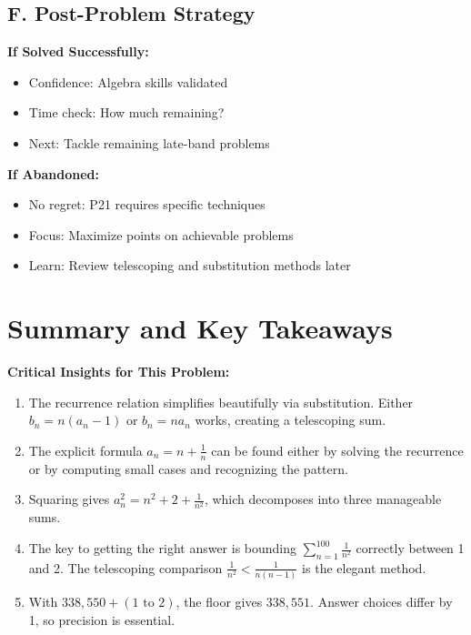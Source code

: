 \documentclass[12pt]{article}
\begin{document}
\begin{competitionbox}
\subsection*{F. Post-Problem Strategy}

\textbf{If Solved Successfully:}
\begin{itemize}
    \item Confidence: Algebra skills validated
    \item Time check: How much remaining?
    \item Next: Tackle remaining late-band problems
\end{itemize}

\textbf{If Abandoned:}
\begin{itemize}
    \item No regret: P21 requires specific techniques
    \item Focus: Maximize points on achievable problems
    \item Learn: Review telescoping and substitution methods later
\end{itemize}

\end{competitionbox}

\section{Summary and Key Takeaways}

\begin{keyinsight}
\textbf{Critical Insights for This Problem:}

\begin{enumerate}
    \item The recurrence relation simplifies beautifully via substitution. Either $b_n = n(a_n-1)$ or $b_n = na_n$ works, creating a telescoping sum.
    
    \item The explicit formula $a_n = n + \frac{1}{n}$ can be found either by solving the recurrence or by computing small cases and recognizing the pattern.
    
    \item Squaring gives $a_n^2 = n^2 + 2 + \frac{1}{n^2}$, which decomposes into three manageable sums.
    
    \item The key to getting the right answer is bounding $\sum_{n=1}^{100} \frac{1}{n^2}$ correctly between 1 and 2. The telescoping comparison $\frac{1}{n^2} < \frac{1}{n(n-1)}$ is the elegant method.
    
    \item With $338,550 + (1 \text{ to } 2)$, the floor gives $338,551$. Answer choices differ by 1, so precision is essential.
\end{enumerate}
\end{keyinsight}
\end{document}
